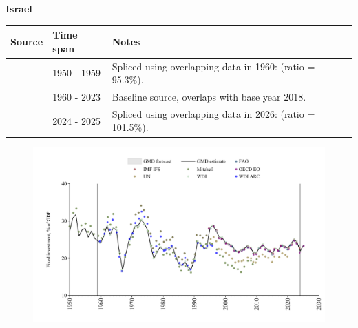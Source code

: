 \documentclass[12pt,a4paper,landscape]{article}
\begin{document}
\begin{adjustbox}{max totalsize={\paperwidth}{\paperheight},center}
\begin{minipage}[t][\textheight][t]{\textwidth}
\vspace*{0.5cm}
{}
\begin{center}
{\Large\bfseries Israel}
\end{center}
\vspace{0.5cm}
\begin{table}[H]
\centering
\small
\begin{tabular}{|l|l|l|}
\hline
\textbf{Source} & \textbf{Time span} & \textbf{Notes} \\
\hline
\rowcolor{white}\cite{Mitchell}& 1950 - 1959 &Spliced using overlapping data in 1960: (ratio = 95.3\%).\\
\rowcolor{lightgray}\cite{WDI}& 1960 - 2023 &Baseline source, overlaps with base year 2018.\\
\rowcolor{white}\cite{OECD_EO}& 2024 - 2025 &Spliced using overlapping data in 2026: (ratio = 101.5\%).\\
\hline
\end{tabular}
\end{table}
\begin{figure}[H]
\centering
\includegraphics[width=\textwidth,height=0.6\textheight,keepaspectratio]{graphs/ISR_finv_GDP.pdf}
\end{figure}
\end{minipage}
\end{adjustbox}
\end{document}
